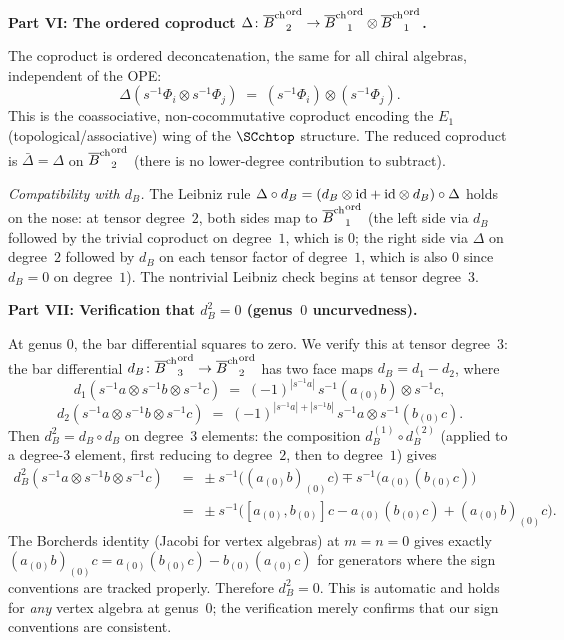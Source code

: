 \begin{computation}
\medskip
\noindent\textbf{Part VI: The ordered coproduct
$\Delta\colon{\overline{B}^{\mathrm{ch}}}^{\mathrm{ord}}_2
\to {\overline{B}^{\mathrm{ch}}}^{\mathrm{ord}}_1\otimes
{\overline{B}^{\mathrm{ch}}}^{\mathrm{ord}}_1$.}

The coproduct is ordered deconcatenation, the same for
all chiral algebras, independent of the OPE:
\begin{equation}\label{eq:ordered-coproduct}
\Delta(s^{-1}\Phi_i\otimes s^{-1}\Phi_j)
\;=\;
(s^{-1}\Phi_i)\otimes(s^{-1}\Phi_j).
\end{equation}
This is the coassociative, non-cocommutative coproduct
encoding the $E_1$ (topological/associative) wing of the
$\SCchtop$ structure. The reduced coproduct is
$\bar\Delta = \Delta$
on ${\overline{B}^{\mathrm{ch}}}^{\mathrm{ord}}_2$ (there is no lower-degree
contribution to subtract).

\emph{Compatibility with $d_B$.}
The Leibniz rule $\Delta\circ d_B
= (d_B\otimes\mathrm{id} + \mathrm{id}\otimes d_B)\circ\Delta$
holds on the nose: at tensor degree~$2$, both sides map to
${\overline{B}^{\mathrm{ch}}}^{\mathrm{ord}}_1$ (the left side via
$d_B$ followed by the trivial coproduct on degree~$1$,
which is $0$; the right side via $\Delta$ on degree~$2$
followed by $d_B$ on each tensor factor of degree~$1$,
which is also $0$ since $d_B=0$ on degree~$1$). The
nontrivial Leibniz check begins at tensor degree~$3$.

\medskip
\noindent\textbf{Part VII: Verification that
$d_B^2 = 0$ (genus~$0$ uncurvedness).}

At genus $0$, the bar differential squares to zero. We
verify this at tensor degree~$3$: the bar differential
$d_B\colon{\overline{B}^{\mathrm{ch}}}^{\mathrm{ord}}_3\to
{\overline{B}^{\mathrm{ch}}}^{\mathrm{ord}}_2$ has two face maps
$d_B = d_1 - d_2$, where
\[
d_1(s^{-1}a\otimes s^{-1}b\otimes s^{-1}c)
\;=\;
(-1)^{|s^{-1}a|}\,s^{-1}(a_{(0)}b)\otimes s^{-1}c,
\]
\[
d_2(s^{-1}a\otimes s^{-1}b\otimes s^{-1}c)
\;=\;
(-1)^{|s^{-1}a|+|s^{-1}b|}\,
s^{-1}a\otimes s^{-1}(b_{(0)}c).
\]
Then $d_B^2 = d_B\circ d_B$ on degree~$3$ elements:
the composition $d_B^{(1)}\circ d_B^{(2)}$ (applied
to a degree-$3$ element, first reducing to degree~$2$,
then to degree~$1$) gives
\begin{align*}
d_B^2(s^{-1}a\otimes s^{-1}b\otimes s^{-1}c)
&\;=\;
\pm s^{-1}\bigl((a_{(0)}b)_{(0)}c\bigr)
\mp s^{-1}\bigl(a_{(0)}(b_{(0)}c)\bigr) \\
&\;=\;
\pm s^{-1}\bigl([a_{(0)},b_{(0)}]c
- a_{(0)}(b_{(0)}c) + (a_{(0)}b)_{(0)}c\bigr).
\end{align*}
The Borcherds identity (Jacobi for vertex algebras) at
$m=n=0$ gives exactly
$(a_{(0)}b)_{(0)}c = a_{(0)}(b_{(0)}c) - b_{(0)}(a_{(0)}c)$
for generators where the sign conventions are tracked
properly. Therefore $d_B^2 = 0$. This is automatic and
holds for \emph{any} vertex algebra at genus~$0$; the
verification merely confirms that our sign conventions are
consistent.


\end{computation}
